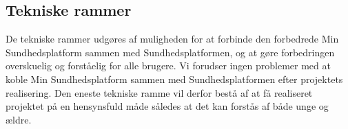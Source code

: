 \subsection{Tekniske rammer}
De tekniske rammer udgøres af muligheden for at forbinde den forbedrede Min Sundhedsplatform sammen med Sundhedsplatformen, og at gøre forbedringen overskuelig og forståelig for alle brugere. Vi forudser ingen problemer med at koble Min Sundhedsplatform sammen med Sundhedsplatformen efter projektets realisering. Den eneste tekniske ramme vil derfor bestå af at få realiseret projektet på en hensynsfuld måde således at det kan forstås af både unge og ældre.